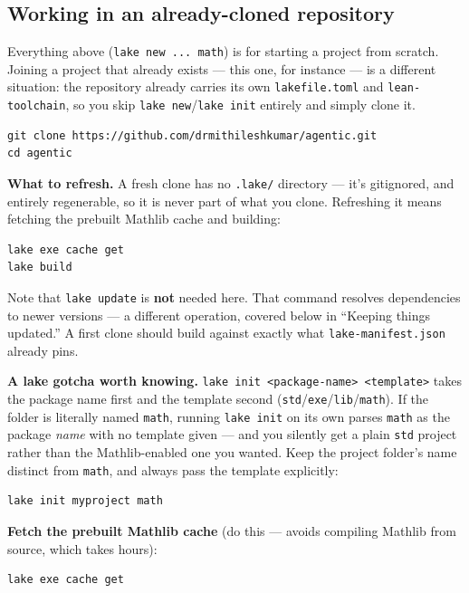 \subsection{Working in an already-cloned repository}

Everything above (\texttt{lake new ... math}) is for starting a project from scratch. Joining a project that already exists --- this one, for instance --- is a different situation: the repository already carries its own \texttt{lakefile.toml} and \texttt{lean-toolchain}, so you skip \texttt{lake new}/\texttt{lake init} entirely and simply clone it.

\begin{verbatim}
git clone https://github.com/drmithileshkumar/agentic.git
cd agentic
\end{verbatim}

\textbf{What to refresh.} A fresh clone has no \texttt{.lake/} directory --- it's gitignored, and entirely regenerable, so it is never part of what you clone. Refreshing it means fetching the prebuilt Mathlib cache and building:

\begin{verbatim}
lake exe cache get
lake build
\end{verbatim}

Note that \texttt{lake update} is \textbf{not} needed here. That command resolves dependencies to newer versions --- a different operation, covered below in ``Keeping things updated.'' A first clone should build against exactly what \texttt{lake-manifest.json} already pins.

\textbf{A lake gotcha worth knowing.} \texttt{lake init <package-name> <template>} takes the package name first and the template second (\texttt{std}/\texttt{exe}/\texttt{lib}/\texttt{math}). If the folder is literally named \texttt{math}, running \texttt{lake init} on its own parses \texttt{math} as the package \emph{name} with no template given --- and you silently get a plain \texttt{std} project rather than the Mathlib-enabled one you wanted. Keep the project folder's name distinct from \texttt{math}, and always pass the template explicitly:

\begin{verbatim}
lake init myproject math
\end{verbatim}

\textbf{Fetch the prebuilt Mathlib cache} (do this --- avoids compiling Mathlib from source, which takes hours):

\begin{verbatim}
lake exe cache get
\end{verbatim}

